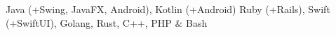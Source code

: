 
\begin{sectiondescription}
  Java (+Swing, JavaFX, Android),
  Kotlin (+Android)
  Ruby (+Rails),
  Swift (+SwiftUI),
  Golang, Rust, C++,
  PHP
  \& Bash
\end{sectiondescription}
